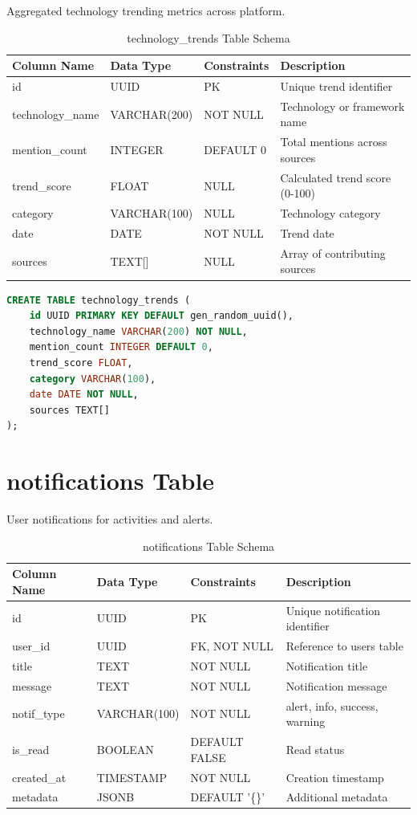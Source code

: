 \documentclass[12pt,a4paper]{report}
\begin{document}
Aggregated technology trending metrics across platform.

\begin{table}[h]
\centering
\small
\caption{technology\_trends Table Schema}
\begin{tabular}{|l|l|l|l|}
\toprule
\textbf{Column Name} & \textbf{Data Type} & \textbf{Constraints} & \textbf{Description} \\
\midrule
id & UUID & PK & Unique trend identifier \\
technology\_name & VARCHAR(200) & NOT NULL & Technology or framework name \\
mention\_count & INTEGER & DEFAULT 0 & Total mentions across sources \\
trend\_score & FLOAT & NULL & Calculated trend score (0-100) \\
category & VARCHAR(100) & NULL & Technology category \\
date & DATE & NOT NULL & Trend date \\
sources & TEXT[] & NULL & Array of contributing sources \\
\bottomrule
\end{tabular}
\end{table}

\begin{lstlisting}[language=SQL,basicstyle=\ttfamily\small]
CREATE TABLE technology_trends (
    id UUID PRIMARY KEY DEFAULT gen_random_uuid(),
    technology_name VARCHAR(200) NOT NULL,
    mention_count INTEGER DEFAULT 0,
    trend_score FLOAT,
    category VARCHAR(100),
    date DATE NOT NULL,
    sources TEXT[]
);
\end{lstlisting}

\newpage
\section{notifications Table}

User notifications for activities and alerts.

\begin{table}[h]
\centering
\small
\caption{notifications Table Schema}
\begin{tabular}{|l|l|l|l|}
\toprule
\textbf{Column Name} & \textbf{Data Type} & \textbf{Constraints} & \textbf{Description} \\
\midrule
id & UUID & PK & Unique notification identifier \\
user\_id & UUID & FK, NOT NULL & Reference to users table \\
title & TEXT & NOT NULL & Notification title \\
message & TEXT & NOT NULL & Notification message \\
notif\_type & VARCHAR(100) & NOT NULL & alert, info, success, warning \\
is\_read & BOOLEAN & DEFAULT FALSE & Read status \\
created\_at & TIMESTAMP & NOT NULL & Creation timestamp \\
metadata & JSONB & DEFAULT '\{\}' & Additional metadata \\
\bottomrule
\end{tabular}
\end{table}
\end{document}
